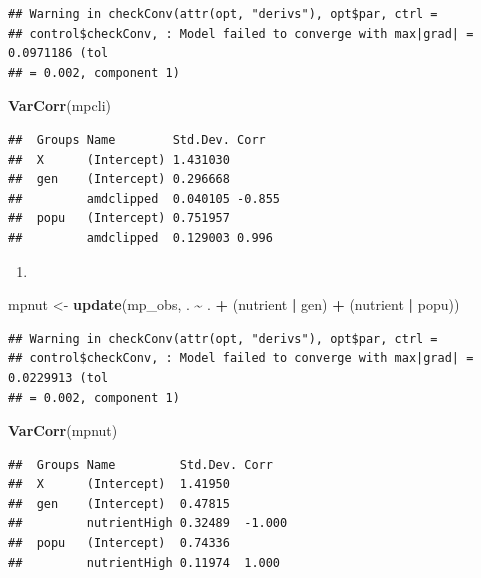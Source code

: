 \documentclass[
  12pt,
]{book}
\newenvironment{Shaded}{\begin{snugshade}}{\end{snugshade}}
\newcommand{\KeywordTok}[1]{\textcolor[rgb]{0.13,0.29,0.53}{\textbf{#1}}}
\newcommand{\NormalTok}[1]{#1}
\newcommand{\OperatorTok}[1]{\textcolor[rgb]{0.81,0.36,0.00}{\textbf{#1}}}
\newcommand{\StringTok}[1]{\textcolor[rgb]{0.31,0.60,0.02}{#1}}
\providecommand{\tightlist}{%
  \setlength{\itemsep}{0pt}\setlength{\parskip}{0pt}}
\begin{document}
\begin{verbatim}
## Warning in checkConv(attr(opt, "derivs"), opt$par, ctrl =
## control$checkConv, : Model failed to converge with max|grad| = 0.0971186 (tol
## = 0.002, component 1)
\end{verbatim}

\begin{Shaded}
\begin{Highlighting}[]
\KeywordTok{VarCorr}\NormalTok{(mpcli)}
\end{Highlighting}
\end{Shaded}

\begin{verbatim}
##  Groups Name        Std.Dev. Corr  
##  X      (Intercept) 1.431030       
##  gen    (Intercept) 0.296668       
##         amdclipped  0.040105 -0.855
##  popu   (Intercept) 0.751957       
##         amdclipped  0.129003 0.996
\end{verbatim}

\begin{enumerate}
\def\labelenumi{\arabic{enumi}.}
\setcounter{enumi}{1}
\tightlist
\item
\end{enumerate}

\begin{Shaded}
\begin{Highlighting}[]
\NormalTok{mpnut \textless{}{-}}\StringTok{ }\KeywordTok{update}\NormalTok{(mp\_obs, . }\OperatorTok{\textasciitilde{}}\StringTok{ }\NormalTok{. }\OperatorTok{+}\StringTok{ }\NormalTok{(nutrient }\OperatorTok{|}\StringTok{ }\NormalTok{gen) }\OperatorTok{+}\StringTok{ }\NormalTok{(nutrient }\OperatorTok{|}\StringTok{ }\NormalTok{popu))}
\end{Highlighting}
\end{Shaded}

\begin{verbatim}
## Warning in checkConv(attr(opt, "derivs"), opt$par, ctrl =
## control$checkConv, : Model failed to converge with max|grad| = 0.0229913 (tol
## = 0.002, component 1)
\end{verbatim}

\begin{Shaded}
\begin{Highlighting}[]
\KeywordTok{VarCorr}\NormalTok{(mpnut)}
\end{Highlighting}
\end{Shaded}

\begin{verbatim}
##  Groups Name         Std.Dev. Corr  
##  X      (Intercept)  1.41950        
##  gen    (Intercept)  0.47815        
##         nutrientHigh 0.32489  -1.000
##  popu   (Intercept)  0.74336        
##         nutrientHigh 0.11974  1.000
\end{verbatim}
\end{document}
